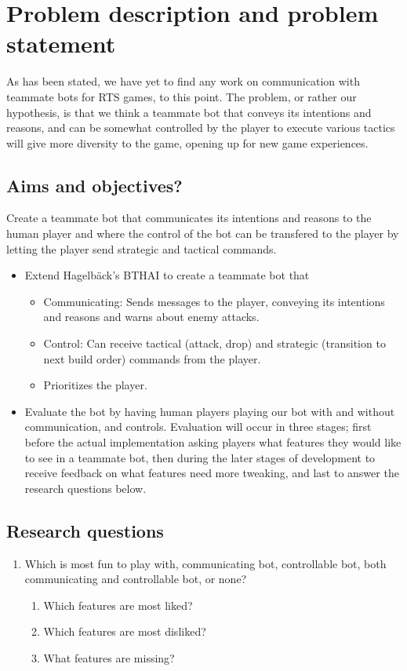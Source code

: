 \chapter{Problem description and problem statement}
As has been stated, we have yet to find any work on communication with teammate bots for RTS games,
to this point. The problem, or rather our hypothesis, is that we think a teammate bot that conveys
its intentions and reasons, and can be somewhat controlled by the player to execute various tactics
will give more diversity to the game, opening up for new game experiences.

\section{Aims and objectives?}
Create a teammate bot that communicates its intentions and reasons to the human player and where the
control of the bot can be transfered to the player by letting the player send strategic and tactical
commands.
\begin{itemize}
	\item Extend Hagelbäck's BTHAI\cite{bthai} to create a teammate bot that
	\begin{itemize}
		\item Communicating: Sends messages to the player, conveying its intentions and reasons and
		  warns about enemy attacks.
		\item Control: Can receive tactical (attack, drop) and strategic (transition to next build
			order) commands from the player.
		\item Prioritizes the player. 
	\end{itemize}
	\item Evaluate the bot by having human players playing our bot with and without communication, and
		controls. Evaluation will occur in three stages; first before the actual implementation asking
		players what features they would like to see in a teammate bot, then during the later stages of
		development to receive feedback on what features need more tweaking, and last to answer the
		research questions below.
\end{itemize}

\section{Research questions}
\renewcommand{\theenumii}{\arabic{enumi}.\arabic{enumii}}
\renewcommand{\labelenumii}{\theenumii.}
\begin{enumerate}
	\item	Which is most fun to play with, communicating bot, controllable bot, both communicating and
		controllable bot, or none?
	\begin{enumerate}
		\item Which features are most liked?
		\item Which features are most disliked?
		\item What features are missing?
	\end{enumerate}
\end{enumerate}

